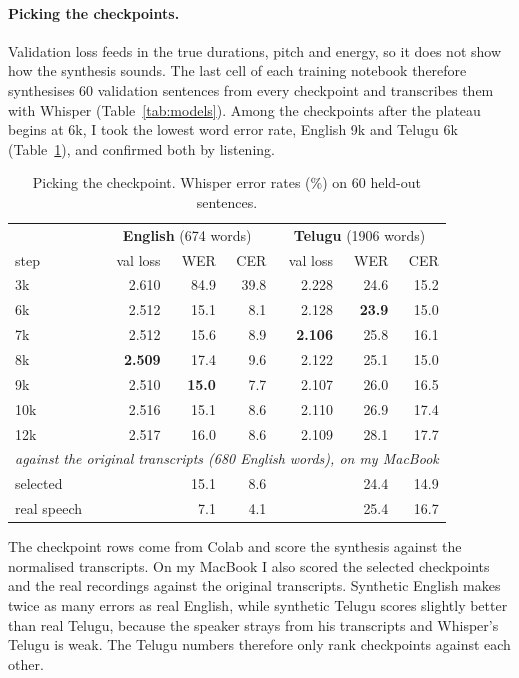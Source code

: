 \documentclass[11pt,a4paper]{article}
\begin{document}
\paragraph{Picking the checkpoints.} Validation loss feeds in the true durations, pitch and energy, so it does not
show how the synthesis sounds. The last cell of each training notebook therefore synthesises 60 validation
sentences from every checkpoint and transcribes them with Whisper (Table~\ref{tab:models}). Among the
checkpoints after the plateau begins at 6k, I took the lowest word error rate, English 9k and Telugu 6k
(Table~\ref{tab:asr}), and confirmed both by listening.

\begin{table}[!htbp]
\centering\small
\begin{tabular}{lrrr|rrr}
\toprule
& \multicolumn{3}{c|}{\textbf{English} (674 words)} & \multicolumn{3}{c}{\textbf{Telugu} (1906 words)} \\
step & val loss & WER & CER & val loss & WER & CER \\
\midrule
3k & 2.610 & 84.9 & 39.8 & 2.228 & 24.6 & 15.2 \\
6k & 2.512 & 15.1 & 8.1 & 2.128 & \textbf{23.9} & 15.0 \\
7k & 2.512 & 15.6 & 8.9 & \textbf{2.106} & 25.8 & 16.1 \\
8k & \textbf{2.509} & 17.4 & 9.6 & 2.122 & 25.1 & 15.0 \\
9k & 2.510 & \textbf{15.0} & 7.7 & 2.107 & 26.0 & 16.5 \\
10k & 2.516 & 15.1 & 8.6 & 2.110 & 26.9 & 17.4 \\
12k & 2.517 & 16.0 & 8.6 & 2.109 & 28.1 & 17.7 \\
\midrule
\multicolumn{7}{l}{\emph{against the original transcripts (680 English words), on my MacBook}} \\
selected & & 15.1 & 8.6 & & 24.4 & 14.9 \\
real speech & & 7.1 & 4.1 & & 25.4 & 16.7 \\
\bottomrule
\end{tabular}
\caption{Picking the checkpoint. Whisper error rates (\%) on 60 held-out sentences.}
\label{tab:asr}
\end{table}

The checkpoint rows come from Colab and score the synthesis against the normalised transcripts. On my MacBook I
also scored the selected checkpoints and the real recordings against the original transcripts. Synthetic English
makes twice as many errors as real English, while synthetic Telugu scores slightly better than real Telugu,
because the speaker strays from his transcripts and Whisper's Telugu is weak. The Telugu numbers therefore only
rank checkpoints against each other.
\end{document}
